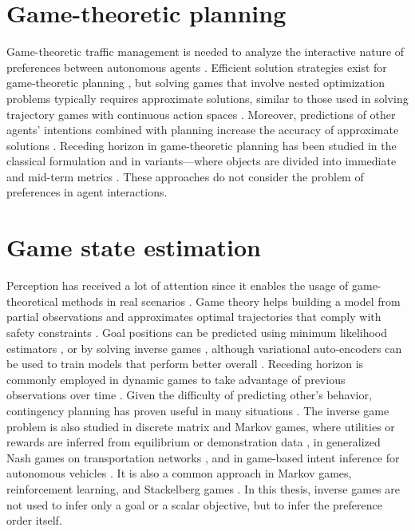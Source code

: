 \section{Game-theoretic planning}
\label{sec:game-theoretic-planning}
Game-theoretic traffic
management is needed to analyze the interactive nature of preferences between
autonomous agents \cite{qin:2024}. Efficient solution strategies exist
for game-theoretic planning \cite{laine:2021,williams:2023,mehr:2023,zhu:2023}, but solving games that involve nested optimization problems typically requires approximate solutions, similar to those used in solving trajectory games with continuous action spaces \cite{jond:2022,peters:2022,liu:2023}.
Moreover, predictions of other agents' intentions combined with planning
increase the accuracy of approximate solutions \cite{li:2022,zhang:2023}. Receding
horizon in game-theoretic planning has been studied in the classical formulation
\cite{veer:2023} and in variants---where objects are divided into immediate
and mid-term metrics \cite{fisac:2019}. These approaches do not consider the
problem of preferences in agent interactions.

\section{Game state estimation}
\label{sec:game-state-estimation}
Perception has received a lot of attention since it enables the usage of game-theoretical methods in real scenarios \cite{schwarting:2018}.
Game theory helps building a model from partial observations \cite{liniger:2020} and approximates optimal trajectories that comply with safety constraints \cite{fridovichkeil:2020}.
Goal positions can be predicted using minimum likelihood estimators \cite{liu:2023}, or by solving inverse games \cite{li:2023}, although variational auto-encoders can be used to train models that perform better overall \cite{liu:2024}. Receding horizon is commonly employed in dynamic games to take advantage of
previous observations over time \cite{peters:2023}.
Given the difficulty of predicting other's behavior, contingency planning has proven useful in many situations \cite{peters:2024}.
The inverse game problem is also studied in discrete matrix and Markov games, where utilities or
rewards are inferred from equilibrium or demonstration data \cite{wang:2018,yu:2019,yu:2023},
in generalized Nash games on transportation networks \cite{allen:2022}, and in game-based
intent inference for autonomous vehicles \cite{wang:2020}. It is also a common approach in
Markov games, reinforcement learning, and Stackelberg games \cite{chen:2023,lian:2024,ward:2025}.
In this thesis, inverse games are not used to infer only a goal or a scalar objective, but to infer the preference order itself.

